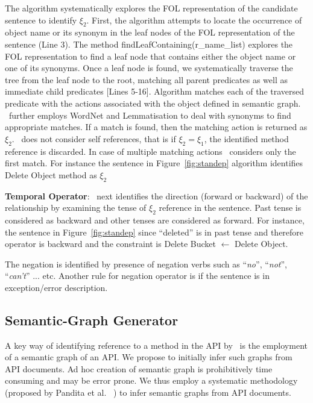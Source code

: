 The algorithm systematically explores the FOL representation
of the candidate sentence to identify $\xi_2$. First, the algorithm
attempts to locate the occurrence of object name or its synonym
in the leaf nodes of the FOL
representation of the sentence (Line 3). The method
findLeafContaining(r\_name\_list) explores the FOL representation
to find a leaf node that contains either the object name
or one of its synonyms.
Once a leaf node is found, we systematically
traverse the tree from the leaf node to the root,
matching all parent predicates as well as immediate child
predicates [Lines 5-16].
Algorithm matches each of the traversed predicate
with the actions associated with the object defined in
semantic graph. 
\tool\ further employs WordNet and Lemmatisation to deal with
synonyms to find appropriate matches. If a match is
found, then the matching action is returned as $\xi_2$.
\tool\ does not consider self references, that is if $\xi_2 = \xi_1$, the identified method reference is discarded.
In case of multiple matching actions \tool\ considers only the first match.
For instance the sentence in Figure~\ref{fig:standep} algorithm identifies
Delete Object method as $\xi_2$

\textbf{Temporal Operator}:
\tool\ next identifies the direction (forward or backward) of the relationship by examining the tense of $\xi_2$ reference in the sentence. Past tense is considered as backward and other tenses are considered as forward. For instance, the sentence in Figure~\ref{fig:standep} since ``deleted'' is in past tense and therefore operator is backward and the constraint is 
Delete Bucket $\leftarrow$ Delete Object.

The negation is identified by presence of negation verbs such as ``\textit{no}'', ``\textit{not}'', ``\textit{can't}'' ... etc. Another rule for negation operator is if the sentence is in exception/error description. 



\subsection{Semantic-Graph Generator}
\label{sub:ACA}

A key way of identifying reference to a method in the API by \tool\ is the employment of a semantic graph of an API.
We propose to initially infer such graphs from API documents.
Ad hoc creation of semantic graph is prohibitively time consuming and may be error prone.
We thus employ a systematic methodology (proposed by Pandita et al. ~\cite{pandita13:WHYPER}) to infer semantic graphs from API documents.

